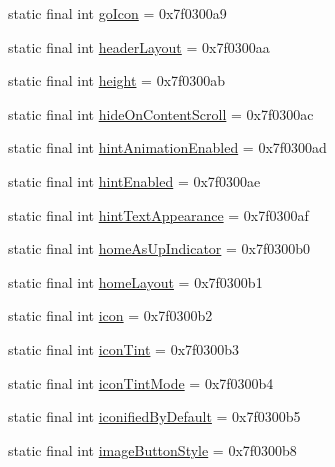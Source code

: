 \begin{DoxyCompactItemize}
\item 
static final int \mbox{\hyperlink{classandroid_1_1support_1_1design_1_1R_1_1attr_ab0832bfcb7a264b7f160a92f19c26514}{go\+Icon}} = 0x7f0300a9
\item 
static final int \mbox{\hyperlink{classandroid_1_1support_1_1design_1_1R_1_1attr_a669a14ce772e913e335a7e450b199e21}{header\+Layout}} = 0x7f0300aa
\item 
static final int \mbox{\hyperlink{classandroid_1_1support_1_1design_1_1R_1_1attr_a67de67e33346463b7e8ccac5a5c3d2b8}{height}} = 0x7f0300ab
\item 
static final int \mbox{\hyperlink{classandroid_1_1support_1_1design_1_1R_1_1attr_afad42994576791dcb844b6d5a92b106e}{hide\+On\+Content\+Scroll}} = 0x7f0300ac
\item 
static final int \mbox{\hyperlink{classandroid_1_1support_1_1design_1_1R_1_1attr_a45965840ce51b3dc10db2c5ed7c0d923}{hint\+Animation\+Enabled}} = 0x7f0300ad
\item 
static final int \mbox{\hyperlink{classandroid_1_1support_1_1design_1_1R_1_1attr_ab0cf90bb8161a418c2e43862ed461e28}{hint\+Enabled}} = 0x7f0300ae
\item 
static final int \mbox{\hyperlink{classandroid_1_1support_1_1design_1_1R_1_1attr_a571b12c480a0e39c924235a502df4a7a}{hint\+Text\+Appearance}} = 0x7f0300af
\item 
static final int \mbox{\hyperlink{classandroid_1_1support_1_1design_1_1R_1_1attr_a2cd44aad7205648aa1db17d8376012c7}{home\+As\+Up\+Indicator}} = 0x7f0300b0
\item 
static final int \mbox{\hyperlink{classandroid_1_1support_1_1design_1_1R_1_1attr_af4fde3588c8e7ef225a4babe99fb6327}{home\+Layout}} = 0x7f0300b1
\item 
static final int \mbox{\hyperlink{classandroid_1_1support_1_1design_1_1R_1_1attr_a3dd29517b74c4eefbf204f5f85f3788e}{icon}} = 0x7f0300b2
\item 
static final int \mbox{\hyperlink{classandroid_1_1support_1_1design_1_1R_1_1attr_a9765bcbbf6c76cc6c4873eaa3e24d0bb}{icon\+Tint}} = 0x7f0300b3
\item 
static final int \mbox{\hyperlink{classandroid_1_1support_1_1design_1_1R_1_1attr_a2b4ab026128c61cab1373dce1713a691}{icon\+Tint\+Mode}} = 0x7f0300b4
\item 
static final int \mbox{\hyperlink{classandroid_1_1support_1_1design_1_1R_1_1attr_af56e63f7366c9cd5ce1c639e20df1369}{iconified\+By\+Default}} = 0x7f0300b5
\item 
static final int \mbox{\hyperlink{classandroid_1_1support_1_1design_1_1R_1_1attr_af7235a5110e0fe6517ca8e216ef5f42f}{image\+Button\+Style}} = 0x7f0300b8

\end{DoxyCompactItemize}

